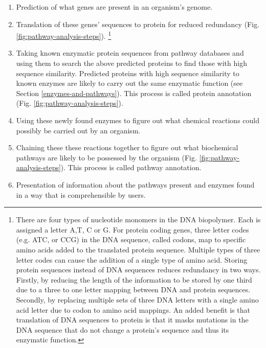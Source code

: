 \begin{enumerate}
\item Prediction of what genes are present in an organism's genome.
\item Translation of these genes' sequences to protein for reduced redundancy (Fig. \ref{fig:pathway-analysis-steps}). \footnote{There are four types of nucleotide monomers in the DNA biopolymer. Each is assigned a letter A,T, C or G. For protein coding genes, three letter codes (e.g. ATC, or CCG) in the DNA sequence, called codons, map to specific amino acids added to the translated protein sequence. Multiple types of three letter codes can cause the addition of a single type of amino acid. Storing protein sequences instead of DNA sequences reduces redundancy in two ways. Firstly, by reducing the length of the information to be stored by one third due to a three to one letter mapping between DNA and protein sequences. Secondly, by replacing multiple sets of three DNA letters with a single amino acid letter due to codon to amino acid mappings. An added benefit is that translation of DNA sequences to protein is that it masks mutations in the DNA sequence that do not change a protein's sequence and thus its enzymatic function.} 
\item Taking known enzymatic protein sequences from pathway databases and using them to search the above predicted proteins to find those with high sequence similarity. Predicted proteins with high sequence similarity to known enzymes are likely to carry out the same enzymatic function (see Section \ref{enzymes-and-pathways}). This process is called protein annotation (Fig. \ref{fig:pathway-analysis-steps}).
\item Using these newly found enzymes to figure out what chemical reactions could possibly be carried out by an organism.
\item Chaining these these reactions together to figure out what biochemical pathways are likely to be possessed by the organism (Fig. \ref{fig:pathway-analysis-steps}). This process is called pathway annotation.
\item Presentation of information about the pathways present and enzymes found in a way that is comprehensible by users.
\end{enumerate}

